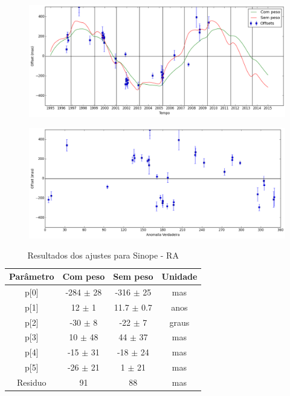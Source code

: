 \documentclass[11pt,a4paper]{report}
\begin{document}
\begin{figure}[h]
\includegraphics[scale=0.45]{Sinope/RA.png} 
\end{figure}

\begin{figure}[h]
\includegraphics[scale=0.45]{Sinope/RA_anom.png}  
\end{figure}


\begin{table}[h!]
\caption{\label{Tab: Sinope-RA} Resultados dos ajustes para Sinope - RA}
\begin{centering}
\begin{tabular}{cccc}
\hline
\hline
Parâmetro & Com peso & Sem peso & Unidade\tabularnewline
\hline
p[0] & -284 $\pm$ 28 & -316 $\pm$ 25 & mas\\
p[1] & 12 $\pm$ 1 & 11.7 $\pm$ 0.7 & anos\\
p[2] & -30 $\pm$ 8 & -22 $\pm$ 7 & graus\\
p[3] & 10 $\pm$ 48 & 44 $\pm$ 37 & mas\\
p[4] & -15 $\pm$ 31 & -18 $\pm$ 24 & mas\\
p[5] & -26 $\pm$ 21 & 1 $\pm$ 21 & mas\\
Residuo & 91 & 88 & mas\\
\hline 
\end{tabular} 
\par\end{centering}
\end{table}
\end{document}
